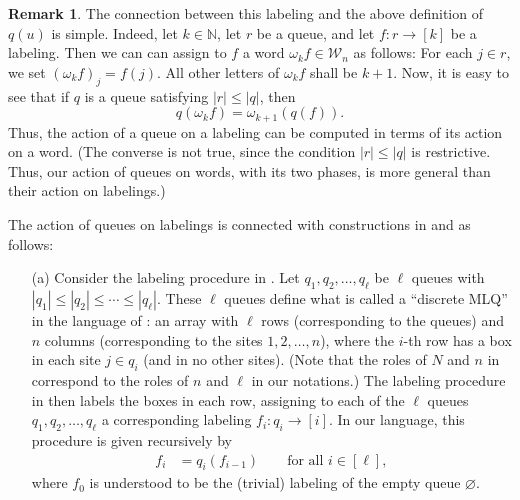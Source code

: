 \documentclass[reqno]{amsart}
\newcommand{\0}{\phantom{c}}
\newcommand{\mcW}{\mathcal{W}}
\newcommand{\NN}{\mathbb{N}}
\newcommand{\abs}[1]{\left| #1 \right|}
\newcommand{\tup}[1]{\left( #1 \right)}
\newcommand{\ive}[1]{\left[ #1 \right]}
\newcommand{\defn}[1]{{\color{darkred}\emph{#1}}} %
\theoremstyle{plain}
\theoremstyle{definition}
\newtheorem{remark}[thm]{Remark}
\numberwithin{equation}{section}
\begin{document}
\begin{remark}
The connection between this labeling and the above definition of $q(u)$ is simple.
Indeed, let $k \in \NN$, let $r$ be a queue, and let $f : r \to \ive{k}$ be a labeling.
Then we can can assign to $f$ a word $\omega_k f \in \mcW_n$ as follows:
For each $j \in r$, we set $\tup{\omega_k f}_j = f \tup{j}$.
All other letters of $\omega_k f$ shall be $k+1$.
Now, it is easy to see that if $q$ is a queue satisfying $\abs{r} \leq \abs{q}$, then
\[
q \tup{ \omega_k f } = \omega_{k+1} \tup{ q(f) } .
\]
Thus, the action of a queue on a labeling can be computed in terms of its action on a word.
(The converse is not true, since the condition $\abs{r} \leq \abs{q}$ is restrictive.
Thus, our action of queues on words, with its two phases, is more general than their
action on labelings.)

The action of queues on labelings is connected with constructions in \cite{AasLin17} and \cite{AssSea18} as follows:

\begin{enumerate}
\item[(a)] Consider the labeling procedure in \cite[\S 2.2]{AasLin17}.
Let $q_1, q_2, \ldots, q_{\ell}$ be $\ell$ queues with
$\abs{q_1} \leq \abs{q_2} \leq \cdots \leq \abs{q_{\ell}}$.
These $\ell$ queues define what is called a ``discrete MLQ'' in the language of \cite{AasLin17}:
an array with $\ell$ rows (corresponding to the queues) and $n$ columns (corresponding to the sites $1, 2, \ldots, n$),
where the $i$-th row has a box in each site $j \in q_i$ (and in no other sites).
(Note that the roles of $N$ and $n$ in \cite{AasLin17} correspond to the roles of $n$ and $\ell$ in our notations.)
The labeling procedure in \cite{AasLin17} then labels the boxes in each row,
assigning to each of the $\ell$ queues $q_1, q_2, \ldots, q_{\ell}$
a corresponding labeling $f_i : q_i \to \ive{i}$.
In our language, this procedure is given recursively by
\begin{align*}
f_i &= q_i \tup{ f_{i-1} } \qquad \text{for all } i \in \ive{\ell} ,
\end{align*}
where $f_0$ is understood to be the (trivial) labeling of the empty queue $\varnothing$.


\end{enumerate}
\end{remark}
\end{document}
